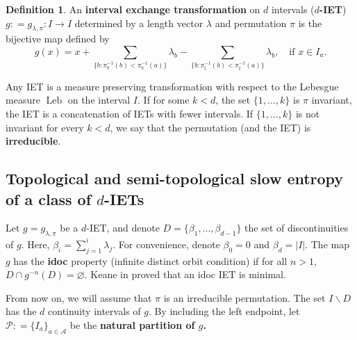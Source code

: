 \documentclass[oneside]{amsart}
\theoremstyle{plain}
\theoremstyle{definition}
\newtheorem{DEF}[THM]{Definition}
\DeclareMathOperator{\Leb}{Leb}
\newcommand{\dfn}{\mathrel{\mathop:}=}
\newcommand{\<}{\langle}
\renewcommand{\>}{\rangle}
\renewcommand{\P}{\mathcal{P}}
\renewcommand{\|}{|\!|} %
\renewcommand{\emptyset}{\varnothing} %
\begin{document}
\begin{DEF}
     An {\bf interval exchange transformation} on $d$ intervals ({\bf $d$-IET}) $g \dfn g_{\lambda,\pi}\colon I \to I$ determined by a length vector $\lambda$ and permutation $\pi$ is the bijective map defined by 
    \begin{equation}
    \label{eq:IET}
        g(x) = x 
        +
        \sum_{\{b:\pi_b^{-1}(b)<\pi^{-1}_b(a)\}}\lambda_b
        -\sum_{\{b : \pi_t^{-1}(b) < \pi_t^{-1}(a)\}}\lambda_b,\quad \text{if }x \in I_a.
    \end{equation} 
\end{DEF}
Any IET is a measure preserving transformation with respect to the Lebesgue measure $\Leb$ on the interval $I.$
If for some $k<d$, the set $\{1,\dots,k\}$ is $\pi$ invariant, the IET is a concatenation of IETs with fewer intervals. If $\{1,\dots,k\}$ is not invariant for every $k<d$, we say that the permutation (and the IET) is {\bf irreducible}.

\subsection{Topological and semi-topological slow entropy of a class of \texorpdfstring{$d$-IETs}{}} Let $g=g_{\lambda,\pi}$ be a $d$-IET, and denote $D=\{\beta_1,\dots,\beta_{d-1}\}$ the set of discontinuities of $g$. Here, $\beta_i = \sum_{j=1}^{i}\lambda_j$. For convenience, denote $\beta_0=0$ and $\beta_d=|I|$.
The map $g$ has the {\bf idoc} property (infinite distinct orbit condition) if for all $n>1$, $D \cap g^{-n}(D) =\emptyset.$ 
Keane in \cite{Keane1975} proved that an idoc IET is minimal.

From now on, we will assume that $\pi$ is an irreducible permutation.
The set $I\backslash D$ has the $d$ continuity intervals of $g.$ By including the left endpoint, let $\P \dfn \{I_a\}_{a\in\mathcal{A}}$ be the {\bf natural partition of $g$.}
\end{document}

